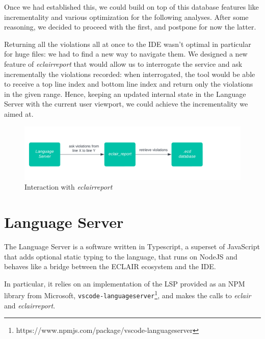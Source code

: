 Once we had established this, we could build on top of this database features like incrementality and various optimization for the following analyses.
After some reasoning, we decided to proceed with the first, and postpone for now the latter. 

Returning all the violations all at once to the IDE wasn't optimal in particular for huge files: we had to find a new way to navigate them.
We designed a new feature of \emph{eclair\textunderscore	report} that would allow us to interrogate the service and ask incrementally the violations recorded: when interrogated, the tool would be able to receive a top line index and bottom line index and return only the violations in the given range.
Hence, keeping an updated internal state in the Language Server with the current user viewport, we could achieve the incrementality we aimed at. 

\begin{figure}[ht]
	\centering
	\includegraphics[width=1\textwidth]{Immagini/eclair_report_flow.jpg}
	\caption{Interaction with \emph{eclair\textunderscore	report}}
	\label{fig:one}
\end{figure}

\section{Language Server}\label{sec:language_server_component}
The Language Server is a software written in Typescript, a superset of JavaScript that adds optional static typing to the language, that runs on NodeJS and behaves like a bridge between the ECLAIR ecosystem and the IDE.

In particular, it relies on an implementation of the LSP provided as an NPM library from Microsoft, \lstinline{vscode-languageserver}\footnote{https://www.npmjs.com/package/vscode-languageserver}, and makes the calls to \emph{eclair} and \emph{eclair\textunderscore	report}. 

